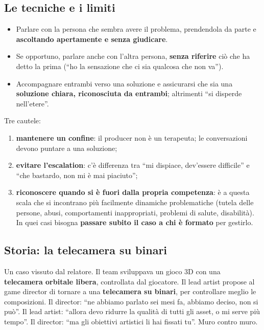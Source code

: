 \subsection{Le tecniche e i limiti}

\begin{itemize}
  \item Parlare con la persona che sembra avere il problema, prendendola da parte e
        \textbf{ascoltando apertamente e senza giudicare}.
  \item Se opportuno, parlare anche con l'altra persona, \textbf{senza riferire}
        ciò che ha detto la prima (``ho la sensazione che ci sia qualcosa che non
        va'').
  \item Accompagnare entrambi verso una soluzione e assicurarsi che sia una
        \textbf{soluzione chiara, riconosciuta da entrambi}; altrimenti ``si
        disperde nell'etere''.
\end{itemize}
Tre cautele:
\begin{enumerate}
  \item \textbf{mantenere un confine}: il producer non è un terapeuta; le
        conversazioni devono puntare a una soluzione;
  \item \textbf{evitare l'escalation}: c'è differenza tra ``mi dispiace, dev'essere
        difficile'' e ``che bastardo, non mi è mai piaciuto'';
  \item \textbf{riconoscere quando si è fuori dalla propria competenza}: è a questa
        scala che si incontrano più facilmente dinamiche problematiche (tutela delle
        persone, abusi, comportamenti inappropriati, problemi di salute,
        disabilità). In quei casi bisogna \textbf{passare subito il caso a chi è
        formato} per gestirlo.
\end{enumerate}

\subsection{Storia: la telecamera su binari}

Un caso vissuto dal relatore. Il team sviluppava un gioco 3D con una
\textbf{telecamera orbitale libera}, controllata dal giocatore. Il lead artist
propose al game director di tornare a una \textbf{telecamera su binari}, per
controllare meglio le composizioni. Il director: ``ne abbiamo parlato sei mesi fa,
abbiamo deciso, non si può''. Il lead artist: ``allora devo ridurre la qualità di
tutti gli asset, o mi serve più tempo''. Il director: ``ma gli obiettivi artistici
li hai fissati tu''. Muro contro muro.

